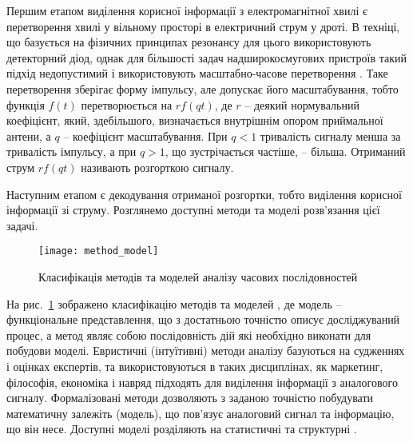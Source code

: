 
Першим етапом виділення корисної інформації з електромагнітної хвилі є 
перетворення хвилі у вільному просторі в електричний струм у дроті. В техніці, 
що базується на фізичних принципах резонансу для цього використовують 
детекторний діод, однак для більшості задач надширокосмугових пристроїв 
такий підхід недопустимий і використовують масштабно-часове перетворення
\cite{imp:Lazorenko2009}. Таке перетворення зберігає форму імпульсу, але 
допускає його масштабування, тобто функція $ f(t) $ перетворюється на 
$ r f(qt) $, де $ r $ -- деякий нормувальний коефіцієнт, який, здебільшого, 
визначається внутрішнім опором приймальної антени, а $ q $ -- коефіцієнт 
масштабування. При $ q < 1 $ тривалість сигналу менша за тривалість імпульсу, 
а при $ q > 1 $, що зустрічається частіше, -- більша. Отриманий струм 
$ r f(qt) $ називають розгорткою сигналу.

Наступним етапом є декодування отриманої розгортки, тобто виділення корисної 
інформації зі струму. Розглянемо доступні методи та моделі розв'язання цієї 
задачі.

\begin{figure}[htbp] \begin{center}
\texttt{[image: method\_model]}
\caption{Класифікація методів та моделей аналізу часових послідовностей} 
\label{fig:method_model}
\end{center} \end{figure}

На рис.~\ref{fig:method_model} зображено класифікацію методів та моделей 
\cite{imp:Chuchueva2012}, де модель -- функціональне представлення, що з 
достатньою точністю описує досліджуваний процес, а метод являє собою 
послідовність дій які необхідно виконати для побудови моделі. Евристичні 
(інтуїтивні) методи аналізу базуються на судженнях і оцінках експертів, 
та використовуються в таких дисциплінах, як маркетинг, філософія, економіка 
і навряд підходять для виділення інформації з аналогового 
сигналу. Формалізовані методи дозволяють з заданою точністю побудувати 
математичну залежіть (модель), що пов'язує аналоговий сигнал та інформацію, 
що він несе. Доступні моделі розділяють на статистичні та структурні 
\cite{imp:Chuchueva2012}.


